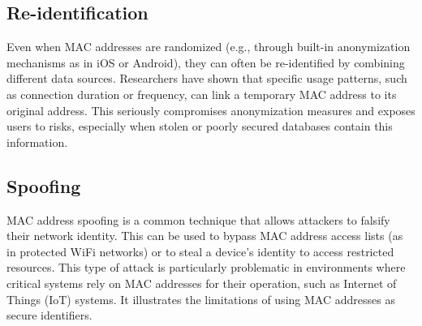 \documentclass[aps,prb,twocolumn,superscriptaddress,floatfix,longbibliography,nofootinbib]{revtex4-2}
\begin{document}
  \subsection{\label{subsec:Reidentification}Re-identification}
  Even when MAC addresses are randomized (e.g., through built-in anonymization 
  mechanisms as in iOS or Android), they can often be re-identified by combining
  different data sources. Researchers have shown that specific usage patterns,
  such as connection duration or frequency, can link a temporary MAC address to its original address.
  This seriously compromises anonymization measures and exposes users to risks,
  especially when stolen or poorly secured databases contain this information.

  \subsection{\label{subsec:Spoofing}Spoofing}
  MAC address spoofing is a common technique that allows attackers to falsify their network identity.
  This can be used to bypass MAC address
  access lists (as in protected WiFi networks) or to steal a device's identity to access restricted resources.
  This type of attack is particularly problematic in environments where critical 
  systems rely on MAC addresses for their operation, such as Internet of Things (IoT) systems. 
  It illustrates the limitations of using MAC addresses as secure identifiers.
\end{document}
